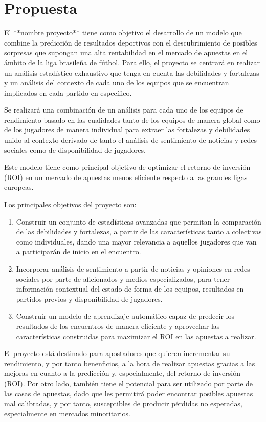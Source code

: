 \section{Propuesta}

El **nombre proyecto** tiene como objetivo el desarrollo de un modelo que combine la predicción de resultados deportivos con el descubrimiento de posibles sorpresas que supongan una alta rentabilidad en el mercado de apuestas en el ámbito de la liga brasileña de fútbol. Para ello, el proyecto se centrará en realizar un análisis estadístico exhaustivo que tenga en cuenta las debilidades y fortalezas y un análisis del contexto de cada uno de los equipos que se encuentran implicados en cada partido en específico.

Se realizará una combinación de un análisis para cada uno de los equipos de rendimiento basado en las cualidades tanto de los equipos de manera global como de los jugadores de manera individual para extraer las fortalezas y debilidades unido al contexto derivado de tanto el análisis de sentimiento de noticias y redes sociales como de disponibilidad de jugadores.

Este modelo tiene como principal objetivo de optimizar el retorno de inversión (ROI) en un mercado de apuestas menos eficiente respecto a las grandes ligas europeas.

Los principales objetivos del proyecto son:

\begin{enumerate}
    \item Construir un conjunto de estadísticas avanzadas que permitan la comparación de las debilidades y fortalezas, a partir de las características tanto a colectivas como individuales, dando una mayor relevancia a aquellos jugadores que van a participarán de inicio en el encuentro.
    \item Incorporar análisis de sentimiento a partir de noticias y opiniones en redes sociales por parte de aficionados y medios especializados, para tener información contextual del estado de forma de los equipos, resultados en partidos previos y disponibilidad de jugadores.
    \item Construir un modelo de aprendizaje automático capaz de predecir los resultados de los encuentros de manera eficiente y aprovechar las características construidas para maximizar el ROI en las apuestas a realizar.
\end{enumerate}

El proyecto está destinado para apostadores que quieren incrementar su rendimiento, y por tanto benenficios, a la hora de realizar apuestas gracias a las mejoras en cuanto a la predicción y, especialmente, del retorno de inversión (ROI). Por otro lado, también tiene el potencial para ser utilizado por parte de las casas de apuestas, dado que les permitirá poder encontrar posibles apuestas mal calibradas, y por tanto, susceptibles de producir pérdidas no esperadas, especialmente en mercados minoritarios.


